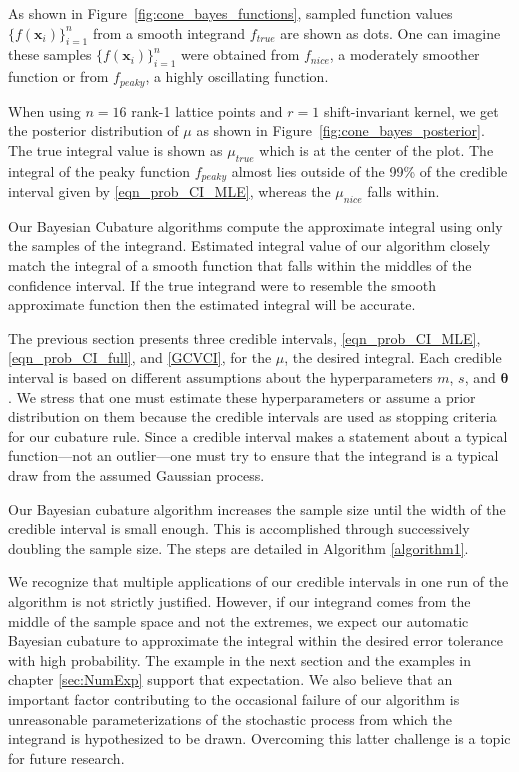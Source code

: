 \documentclass{iitthesis}          %
\newcommand{\bm}[1]{\boldsymbol{#1}}
\newcommand{\vtheta}{{\bm{\theta}}}
\newcommand{\vx}{\bm{x}}
\newcommand\figref{Figure~\ref}
\begin{document}
As shown in \figref{fig:cone_bayes_functions}, sampled function values $\{f(\vx_i)\}_{i=1}^n$ from a smooth integrand $f_{true}$ are shown as dots. One can imagine these samples $\{f(\vx_i)\}_{i=1}^n$ were obtained from $f_{nice}$, a moderately smoother function or from $f_{peaky}$, a highly oscillating function.

When using $n=16$ rank-1 lattice points and $r=1$ shift-invariant kernel, we get the posterior distribution of $\mu$ as shown in \figref{fig:cone_bayes_posterior}. The true integral value is shown as $\mu_{true}$ which is at the center of the plot. The integral of the peaky function $f_{peaky}$ almost lies outside of the 99\% of the credible interval given by \eqref{eqn_prob_CI_MLE}, whereas the $\mu_{nice}$ falls within.

Our Bayesian Cubature algorithms compute the approximate integral using only the samples of the integrand. 
Estimated integral value of our algorithm closely match the integral of a smooth function that falls within the middles of the confidence interval. If the true integrand were to resemble the smooth approximate function then the estimated integral will be accurate.  



\label{sec:bayes_cubature_algo}

The previous section presents three credible intervals, \eqref{eqn_prob_CI_MLE}, \eqref{eqn_prob_CI_full}, and \eqref{GCVCI}, for the $\mu$, the desired integral.  Each credible interval is based on different assumptions about the hyperparameters $m$, $s$, and $\vtheta$.  We stress that one must estimate these hyperparameters or assume a prior distribution on them because the credible intervals are used as stopping criteria for our cubature rule.  Since a credible interval makes a statement about a typical function---not an outlier---one must try to ensure that the integrand is a typical draw from the assumed Gaussian process.

Our  Bayesian cubature algorithm increases the sample size until the width of the credible interval is small enough.  This is accomplished through successively doubling the sample size.  The steps are detailed in Algorithm \ref{algorithm1}.

We recognize that multiple applications of our credible intervals in one run of the algorithm is not strictly justified.  However, if our integrand comes from the middle of the sample space and not the extremes, we expect our automatic Bayesian cubature to approximate the integral within the desired error tolerance with high probability.  The example in the next section and the examples in chapter \ref{sec:NumExp} support that expectation. We also believe that an important factor contributing to the occasional failure of our algorithm is unreasonable parameterizations of the stochastic process from which the integrand is hypothesized to be drawn.  Overcoming this latter challenge is a topic for future research.
\end{document}
